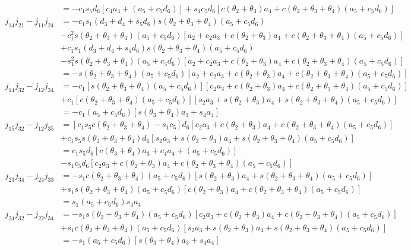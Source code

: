 \begin{align*}
                                &= -c_1s_5d_6[c_4a_4+(a_5+c_5d_6)] + s_1c_5d_6[c(\theta_2+\theta_3)a_4+c(\theta_2+\theta_3+\theta_4)(a_5+c_5d_6)] \\
    j_{14}j_{21} - j_{11}j_{24} &= -c_1s_1(d_3+d_4+s_5d_6)s(\theta_2+\theta_3+\theta_4)(a_5+c_5d_6)\\
                                & -c_1^2s(\theta_2+\theta_3+\theta_4)(a_5+c_5d_6)[a_2+c_2a_3+c(\theta_2+\theta_3)a_4+c(\theta_2+\theta_3+\theta_4)(a_5+c_5d_6)] \\
                                & +c_1s_1(d_3+d_4+s_5d_6)s(\theta_2+\theta_3+\theta_4)(a_5+c_5d_6)\\
                                & -s_1^2s(\theta_2+\theta_3+\theta_4)(a_5+c_5d_6)[a_2+c_2a_3+c(\theta_2+\theta_3)a_4+c(\theta_2+\theta_3+\theta_4)(a_5+c_5d_6)] \\
                                &= -s(\theta_2+\theta_3+\theta_4)(a_5+c_5d_6)[a_2+c_2a_3+c(\theta_2+\theta_3)a_4+c(\theta_2+\theta_3+\theta_4)(a_5+c_5d_6)] \\
    j_{14}j_{32} - j_{12}j_{34} &= -c_1[s(\theta_2+\theta_3+\theta_4)(a_5+c_5d_6)][c_2a_3+c(\theta_2+\theta_3)a_4+c(\theta_2+\theta_3+\theta_4)(a_5+c_5d_6)] \\
                                & +c_1[c(\theta_2+\theta_3+\theta_4)(a_5+c_5d_6)][s_2a_3+s(\theta_2+\theta_3)a_4+s(\theta_2+\theta_3+\theta_4)(a_5+c_5d_6)] \\
                                &= -c_1(a_5+c_5d_6)[s(\theta_3+\theta_4)a_3+s_4a_4]\\
    j_{15}j_{32} - j_{12}j_{35} &= [c_1s_5c(\theta_2+\theta_3+\theta_4)-s_1c_5]d_6[c_2a_3+c(\theta_2+\theta_3)a_4+c(\theta_2+\theta_3+\theta_4)(a_5+c_5d_6)] \\
                                & +c_1s_5s(\theta_2+\theta_3+\theta_4)d_6[s_2a_3+s(\theta_2+\theta_3)a_4+s(\theta_2+\theta_3+\theta_4)(a_5+c_5d_6)] \\
                                &= c_1s_5d_6[c(\theta_3+\theta_4)a_3+c_4a_4+(a_5+c_5d_6)]\\
                                &-s_1c_5d_6[c_2a_3+c(\theta_2+\theta_3)a_4+c(\theta_2+\theta_3+\theta_4)(a_5+c_5d_6)]\\
    j_{23}j_{34} - j_{24}j_{33} &= -s_1c(\theta_2+\theta_3+\theta_4)(a_5+c_5d_6)[s(\theta_2+\theta_3)a_4+s(\theta_2+\theta_3+\theta_4)(a_5+c_5d_6)]\\
                                & +s_1s(\theta_2+\theta_3+\theta_4)(a_5+c_5d_6)[c(\theta_2+\theta_3)a_4+c(\theta_2+\theta_3+\theta_4)(a_5+c_5d_6)] \\
                                &= s_1(a_5+c_5d_6)s_4a_4\\
    j_{24}j_{32} - j_{22}j_{34} &= -s_1s(\theta_2+\theta_3+\theta_4)(a_5+c_5d_6)[c_2a_3+c(\theta_2+\theta_3)a_4+c(\theta_2+\theta_3+\theta_4)(a_5+c_5d_6)]\\
                                & +s_1c(\theta_2+\theta_3+\theta_4)(a_5+c_5d_6)[s_2a_3+s(\theta_2+\theta_3)a_4+s(\theta_2+\theta_3+\theta_4)(a_5+c_5d_6)]\\
                                &= -s_1(a_5+c_5d_6)[s(\theta_3+\theta_4)a_3 + s_4a_4]\\
\end{align*}

